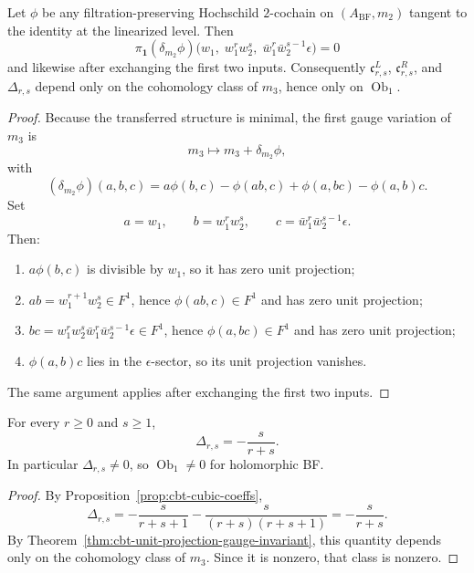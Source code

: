 \begin{theorem}
Let $\phi$ be any filtration-preserving Hochschild $2$-cochain on $(A_{\mathrm{BF}},m_2)$ tangent to the identity at the linearized level. Then
\[
\pi_{\mathbf 1}(\delta_{m_2}\phi)
\bigl(w_1,\;w_1^rw_2^s,\;\bar w_1^r\bar w_2^{s-1}\epsilon\bigr)=0
\]
and likewise after exchanging the first two inputs. Consequently $\mathfrak c^L_{r,s}$, $\mathfrak c^R_{r,s}$, and $\Delta_{r,s}$ depend only on the cohomology class of $m_3$, hence only on $\operatorname{Ob}_1$.
\end{theorem}

\begin{proof}
Because the transferred structure is minimal, the first gauge variation of $m_3$ is
\[
m_3\mapsto m_3+\delta_{m_2}\phi,
\]
with
\[
(\delta_{m_2}\phi)(a,b,c)
=
a\phi(b,c)-\phi(ab,c)+\phi(a,bc)-\phi(a,b)c.
\]
Set
\[
a=w_1,\qquad
b=w_1^rw_2^s,\qquad
c=\bar w_1^r\bar w_2^{s-1}\epsilon.
\]
Then:
\begin{enumerate}[label=\textup{(\arabic*)},leftmargin=2em]
\item $a\phi(b,c)$ is divisible by $w_1$, so it has zero unit projection;
\item $ab=w_1^{r+1}w_2^s\in F^1$, hence $\phi(ab,c)\in F^1$ and has zero unit projection;
\item $bc=w_1^rw_2^s\bar w_1^r\bar w_2^{s-1}\epsilon\in F^1$, hence $\phi(a,bc)\in F^1$ and has zero unit projection;
\item $\phi(a,b)c$ lies in the $\epsilon$-sector, so its unit projection vanishes.
\end{enumerate}
The same argument applies after exchanging the first two inputs.
\end{proof}

\begin{theorem}
For every $r\ge0$ and $s\ge1$,
\[
\Delta_{r,s}=-\frac{s}{r+s}.
\]
In particular $\Delta_{r,s}\neq0$, so $\operatorname{Ob}_1\neq0$ for holomorphic BF.
\end{theorem}

\begin{proof}
By Proposition~\ref{prop:cbt-cubic-coeffs},
\[
\Delta_{r,s}
=
-\frac{s}{r+s+1}-\frac{s}{(r+s)(r+s+1)}
=
-\frac{s}{r+s}.
\]
By Theorem~\ref{thm:cbt-unit-projection-gauge-invariant}, this quantity depends only on the cohomology class of $m_3$. Since it is nonzero, that class is nonzero.
\end{proof}

